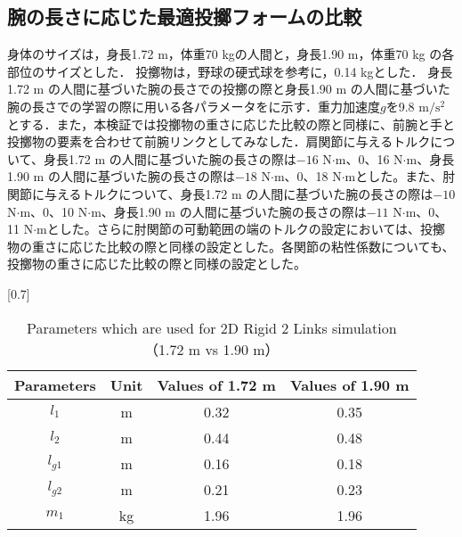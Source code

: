 \begin{small}
\subsection{腕の長さに応じた最適投擲フォームの比較}
身体のサイズは，身長1.72 m，体重70 kgの人間と，身長1.90 m，体重70 kg の各部位のサイズとした．
投擲物は，野球の硬式球を参考に，0.14 kgとした．
身長1.72 m の人間に基づいた腕の長さでの投擲の際と身長1.90 m の人間に基づいた腕の長さでの学習の際に用いる各パラメータをに示す．重力加速度$g$を9.8 $\mathrm{m/s^{2}}$とする．また，本検証では投擲物の重さに応じた比較の際と同様に、前腕と手と投擲物の要素を合わせて前腕リンクとしてみなした．肩関節に与えるトルクについて、身長1.72 m の人間に基づいた腕の長さの際は$-16$ N$\cdot$m、0、16 N$\cdot$m、身長1.90 m の人間に基づいた腕の長さの際は$-18$ N$\cdot$m、0、18 N$\cdot$mとした。また、肘関節に与えるトルクについて、身長1.72 m の人間に基づいた腕の長さの際は$-10$ N$\cdot$m、0、10 N$\cdot$m、身長1.90 m の人間に基づいた腕の長さの際は$-11$ N$\cdot$m、0、11 N$\cdot$mとした。さらに肘関節の可動範囲の端のトルクの設定においては、投擲物の重さに応じた比較の際と同様の設定とした。各関節の粘性係数についても、投擲物の重さに応じた比較の際と同様の設定とした。
\begin{table}[tb]
  \begin{center}
    \caption{Parameters which are used for 2D Rigid 2 Links simulation（1.72 m vs 1.90 m）}
    \scalebox{0.7}[0.7]{
    \begin{tabular}{c|c|c|c}
      \hline
      Parameters & Unit & Values of 1.72 m & Values of 1.90 m \\
      \hline
      $l_{1}$ & m & 0.32 & 0.35 \\
      $l_{2}$ & m & 0.44 & 0.48 \\
      $l_{g1}$ & m & 0.16 & 0.18 \\
      $l_{g2}$ & m & 0.21 & 0.23 \\
      $m_{1}$ & kg & 1.96 & 1.96\\

\end{tabular}}
\end{center}
\end{table}
\end{small}
